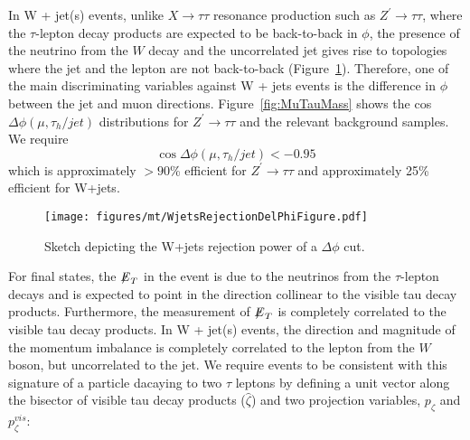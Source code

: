 In W + jet(s) events, unlike $X\rightarrow\tau\tau$ resonance production such as $Z^{\prime} \to \tau\tau$, where the $\tau$-lepton decay products are expected to 
be back-to-back in $\phi$, the presence of the neutrino from the $W$ decay and the uncorrelated jet gives rise to topologies where the jet and the lepton are not 
back-to-back (Figure~\ref{fig:WjetsRejectionDelPhiFigure}). Therefore, one of the main 
discriminating variables against W + jets events is the difference in $\phi$ between the jet and muon directions. 
Figure~\ref{fig:MuTauMass} shows the cos$\Delta \phi(\mu,\tau_{h}/jet)$ distributions for $Z^\prime\to\tau\tau$ and the relevant background samples. 
We require 
\begin{equation}
\cos\Delta\phi(\mu,\tau_{h}/jet) < -0.95
\end{equation}
\noindent which is approximately $> 90$\% efficient for $Z^{\prime} \to \tau\tau$ and approximately 25\% efficient for W+jets.

\begin{figure}
\begin{center}
\texttt{[image: figures/mt/WjetsRejectionDelPhiFigure.pdf]}
\caption{ Sketch depicting the W+jets rejection power of a $\Delta \phi$ cut.}
\label{fig:WjetsRejectionDelPhiFigure}
\end{center}
\end{figure}

For \ditau final states, the ${\not\mathrel{E}}_T$ in the event is due to the neutrinos from the $\tau$-lepton decays and is expected to point in the direction collinear 
to the visible tau decay products. Furthermore, the measurement of ${\not\mathrel{E}}_T$ is completely correlated to the visible tau decay products. In W + jet(s) 
events, the direction and magnitude of the momentum imbalance is completely correlated to the lepton from the $W$ boson, but 
uncorrelated to the jet. We require events to be consistent with this signature of a particle dacaying to two $\tau$ leptons by defining a unit vector along the 
bisector of visible tau decay products ($\hat{\zeta}$) and two projection variables, $p_{\zeta}$ and $p_{\zeta}^{vis}$:

